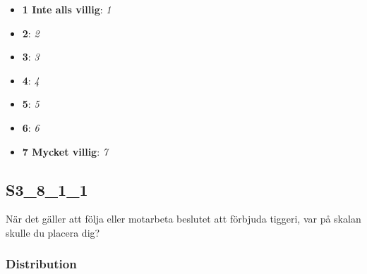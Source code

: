 \documentclass[]{book}
\providecommand{\tightlist}{%
  \setlength{\itemsep}{0pt}\setlength{\parskip}{0pt}}
\begin{document}
\begin{itemize}
\tightlist
\item
  \textbf{1 Inte alls villig}: \emph{1}
\item
  \textbf{2}: \emph{2}
\item
  \textbf{3}: \emph{3}
\item
  \textbf{4}: \emph{4}
\item
  \textbf{5}: \emph{5}
\item
  \textbf{6}: \emph{6}
\item
  \textbf{7 Mycket villig}: \emph{7}
\end{itemize}

\subsection{S3\_8\_1\_1}\label{S3_8_1_1}

När det gäller att följa eller motarbeta beslutet att förbjuda tiggeri,
var på skalan skulle du placera dig?

\subsubsection{Distribution}\label{S3_8_1_1_distribution}
\end{document}

